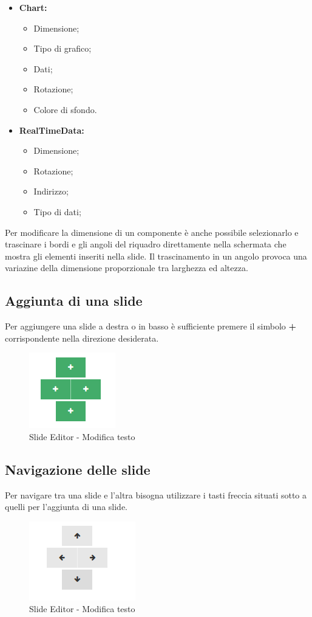 \begin{itemize}
	\item \textbf{Chart:}
		\begin{itemize}
			\item Dimensione;
			\item Tipo di grafico;
			\item Dati;
			\item Rotazione;
			\item Colore di sfondo.
		\end{itemize}
	
	\item \textbf{RealTimeData:}
		\begin{itemize}
			\item Dimensione;
			\item Rotazione;
			\item Indirizzo;
			\item Tipo di dati;
		\end{itemize}
\end{itemize}

\noindent Per modificare la dimensione di un componente è anche possibile selezionarlo e trascinare i bordi e gli angoli del riquadro direttamente nella schermata che mostra gli elementi inseriti nella slide. Il trascinamento in un angolo provoca una variazine della dimensione proporzionale tra larghezza ed altezza. 
 
\subsection{Aggiunta di una slide}
Per aggiungere una slide a destra o in basso è sufficiente premere il simbolo \textbf{+} corrispondente nella direzione desiderata.
\begin{figure}[h] 
      \centering 
      \includegraphics[scale=0.37] {img/piu.png}
      \caption{Slide Editor - Modifica testo} 
  \end{figure}
\subsection{Navigazione delle slide}
Per navigare tra una slide e l'altra bisogna utilizzare i tasti freccia situati sotto a quelli per l'aggiunta di una slide.
\begin{figure}[h] 
		    \centering 
		    \includegraphics[scale=0.37] {img/frecce.png}
		    \caption{Slide Editor - Modifica testo} 
		\end{figure}